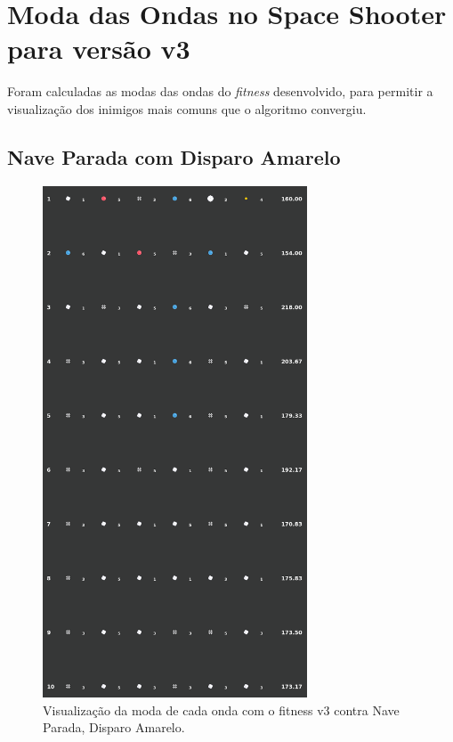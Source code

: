 \chapter{Moda das Ondas no Space Shooter para versão v3}
\label{sec:apend-moda-ss-v3}

Foram calculadas as modas das ondas do \textit{fitness} desenvolvido, para permitir a visualização dos inimigos mais comuns que o algoritmo convergiu.

\section{Nave Parada com Disparo Amarelo}
\label{sec:apend-moda-ss-ys-v3}

\begin{figure}[H]
  \centering
  \includegraphics[width=0.7\textwidth]{figuras/ss/ss_yellowstill_ai_mode_2_1.png}
  \caption{Visualização da moda de cada onda com o fitness v3 contra Nave Parada, Disparo Amarelo.}
  \label{fig:ss-moda-ys-2-1}
\end{figure}

